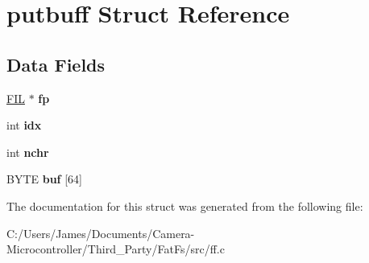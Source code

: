 \hypertarget{structputbuff}{}\section{putbuff Struct Reference}
\label{structputbuff}
\subsection*{Data Fields}
\begin{DoxyCompactItemize}
\item 
\mbox{\label{structputbuff_a8d839bbcaa5e21902d2481c87c4f359f}} 
\hyperlink{struct_f_i_l}{F\+IL} $\ast$ {\bfseries fp}
\item 
\mbox{\label{structputbuff_ae40354a1051342eb5a9db005715dcfa9}} 
int {\bfseries idx}
\item 
\mbox{\label{structputbuff_a1560bca810e056ea71cbf8c667d59580}} 
int {\bfseries nchr}
\item 
\mbox{\label{structputbuff_a6966cd5c37fc8748361cad1ff6f7f640}} 
B\+Y\+TE {\bfseries buf} \mbox{[}64\mbox{]}
\end{DoxyCompactItemize}


The documentation for this struct was generated from the following file\+:\begin{DoxyCompactItemize}
\item 
C\+:/\+Users/\+James/\+Documents/\+Camera-\/\+Microcontroller/\+Third\+\_\+\+Party/\+Fat\+Fs/src/ff.\+c\end{DoxyCompactItemize}
